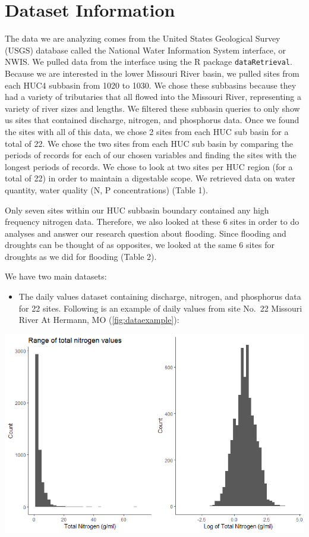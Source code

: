 \documentclass[12pt,]{article}
\providecommand{\tightlist}{%
  \setlength{\itemsep}{0pt}\setlength{\parskip}{0pt}}
\begin{document}
\newpage

\hypertarget{dataset-information}{%
\section{Dataset Information}\label{dataset-information}}

The data we are analyzing comes from the United States Geological Survey
(USGS) database called the National Water Information System interface,
or NWIS. We pulled data from the interface using the R package
\texttt{dataRetrieval}. Because we are interested in the lower Missouri
River basin, we pulled sites from each HUC4 subbasin from 1020 to 1030.
We chose these subbasins because they had a variety of tributaries that
all flowed into the Missouri River, representing a variety of river
sizes and lengths. We filtered these subbasin queries to only show us
sites that contained discharge, nitrogen, and phosphorus data. Once we
found the sites with all of this data, we chose 2 sites from each HUC
sub basin for a total of 22. We chose the two sites from each HUC sub
basin by comparing the periods of records for each of our chosen
variables and finding the sites with the longest periods of records. We
chose to look at two sites per HUC region (for a total of 22) in order
to maintain a digestable scope. We retrieved data on water quantity,
water quality (N, P concentrations) (Table 1).

Only seven sites within our HUC subbasin boundary contained any high
frequency nitrogen data. Therefore, we also looked at these 6 sites in
order to do analyses and answer our research question about flooding.
Since flooding and droughts can be thought of as opposites, we looked at
the same 6 sites for droughts as we did for flooding (Table 2).

We have two main datasets:

\begin{itemize}
\tightlist
\item
  The daily values dataset containing discharge, nitrogen, and
  phosphorus data for 22 sites. Following is an example of daily values
  from site No.~22 Missouri River At Hermann, MO
  (\autoref{fig:dataexample}):
\end{itemize}

\includegraphics[width=10.64in]{../Figures/Nitrogenhist}
\end{document}
